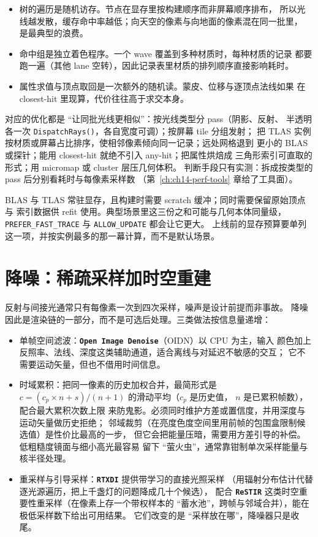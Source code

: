 \documentclass[12pt,a4paper,fontset=fandol]{ctexbook}
\newcommand{\Fn}[1]{\texttt{#1()}}
\newcommand{\Tp}[1]{\texttt{#1}}
\newcommand{\Lib}[1]{\textbf{\texttt{#1}}}
\begin{document}
\begin{itemize}
\item 树的遍历是随机访存。节点在显存里按构建顺序而非屏幕顺序排布，
所以光线越发散，缓存命中率越低；向天空的像素与向地面的像素混在同一批里，
是最典型的浪费。
\item 命中组是独立着色程序。一个 wave 覆盖到多种材质时，每种材质的记录
都要跑一遍（其他 lane 空转），因此记录表里材质的排列顺序直接影响耗时。
\item 属性求值与顶点取回是一次额外的随机读。蒙皮、位移与逐顶点法线如果
在 closest-hit 里现算，代价往往高于求交本身。
\end{itemize}

对应的优化都是 ``让同批光线更相似''：按光线类型分 pass（阴影、反射、
半透明各一次 \Fn{DispatchRays}，各自宽度可调）；按屏幕 tile 分组发射；
把 TLAS 实例按材质或屏幕占比排序，使相邻像素倾向同一记录；远处网格退到
更小的 BLAS 或探针；能用 closest-hit 就绝不引入 any-hit；把属性烘焙成
三角形索引可直取的形式；用 micromap 或 cluster 层压几何体积。
判断手段只有实测：拆成按类型的 pass 后分别看耗时与每像素采样数
（第~\ref{ch:ch14-perf-tools} 章给了工具面）。

\begin{note}[title={加速结构是显存里的第二份几何}]
BLAS 与 TLAS 常驻显存，且构建时需要 scratch 缓冲；同时需要保留原始顶点与
索引数据供 refit 使用。典型场景里这三份之和可能与几何本体同量级，
\Tp{PREFER\_FAST\_TRACE} 与 \Tp{ALLOW\_UPDATE} 都会让它更大。
上线前的显存预算要单列这一项，并按实例最多的那一幕计算，而不是默认场景。
\end{note}

\section{降噪：稀疏采样加时空重建}

反射与间接光通常只有每像素一次到四次采样，噪声是设计前提而非事故。
降噪因此是渲染链的一部分，而不是可选后处理。三类做法按信息量递增：

\begin{itemize}
\item 单帧空间滤波：\Lib{Open Image Denoise}（OIDN）以 CPU 为主，输入
颜色加上反照率、法线、深度这类辅助通道，适合离线与对延迟不敏感的交互；
它不需要运动矢量，但也不借用时间信息。
\item 时域累积：把同一像素的历史加权合并，最简形式是
\(c = (c_{p} \times n + s) / (n + 1)\) 的滑动平均（\(c_{p}\) 是历史值，
\(n\) 是已累积帧数），配合最大累积次数上限
来防鬼影。必须同时维护方差或置信度，并用深度与运动矢量做历史拒绝；
邻域裁剪（在亮度色度空间里用前帧的包围盒限制候选值）是性价比最高的一步，
但它会把能量压暗，需要用方差引导的补偿。低粗糙度镜面与细小高光最容易
留下 ``萤火虫''，通常靠钳制单次采样能量与核半径处理。
\item 重采样与引导采样：\Lib{RTXDI} 提供带学习的直接光照采样
（用辐射分布估计代替逐光源遍历，把上千盏灯的问题降成几十个候选），
配合 \Lib{ReSTIR} 这类时空重要性重采样（在像素上存一个带权样本的
``蓄水池''，跨帧与邻域合并），能在极低采样数下给出可用结果。
它们改变的是 ``采样放在哪''，降噪器只是收尾。
\end{itemize}
\end{document}
